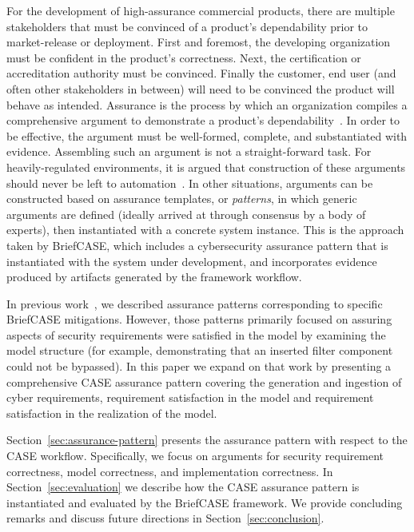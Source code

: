 For the development of high-assurance commercial products, there are multiple stakeholders that must be convinced of a product's dependability prior to market-release or deployment.  First and foremost, the developing organization must be confident in the product's correctness.  Next, the certification or accreditation authority must be convinced.  Finally the customer, end user (and often other stakeholders in between) will need to be convinced the product will behave as intended.  Assurance is the process by which an organization compiles a comprehensive argument to demonstrate a product's dependability~\cite{???}.  In order to be effective, the argument must be well-formed, complete, and substantiated with evidence.  Assembling such an argument is not a straight-forward task.  For heavily-regulated environments, it is argued that construction of these arguments should never be left to automation~\cite{???-Holloway}.  In other situations, arguments can be constructed based on assurance templates, or \textit{patterns}, in which generic arguments are defined (ideally arrived at through consensus by a body of experts), then instantiated with a concrete system instance.  This is the approach taken by BriefCASE, which includes a cybersecurity assurance pattern that is instantiated with the system under development, and incorporates evidence produced by artifacts generated by the framework workflow.



In previous work~\cite{resolute-destion}, we described assurance patterns corresponding to specific BriefCASE mitigations.  However, those patterns primarily focused on assuring aspects of security requirements were satisfied in the model by examining the model structure (for example, demonstrating that an inserted filter component could not be bypassed).  
%
In this paper we expand on that work by presenting a comprehensive CASE assurance pattern covering the generation and ingestion of cyber requirements, requirement satisfaction in the model and requirement satisfaction in the realization of the model.  

Section~\ref{sec:assurance-pattern} presents the assurance pattern with respect to the CASE workflow. Specifically, we focus on arguments for security requirement correctness, model correctness, and implementation correctness.  In Section~\ref{sec:evaluation} we describe how the CASE assurance pattern is instantiated and evaluated by the BriefCASE framework.  We provide concluding remarks and discuss future directions in Section~\ref{sec:conclusion}.